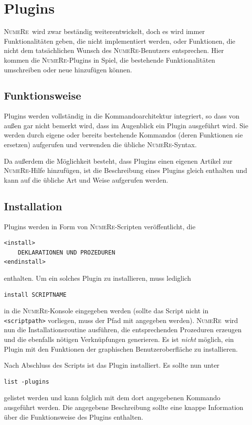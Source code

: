 \documentclass[DIV=14,headsepline,footsepline]{scrbook}
\newcommand{\NR}{\textsc{Nu\-me\-Re}}
\begin{document}
		\chapter{Plugins}
			\NR\ wird zwar beständig weiterentwickelt, doch es wird immer Funktionalitäten geben, die nicht implementiert werden, oder Funktionen, die nicht dem tatsächlichen Wunsch des \NR-Benutzers entsprechen. Hier kommen die \NR-Plugins in Spiel, die bestehende Funktionalitäten umschreiben oder neue hinzufügen können.
			\section{Funktionsweise}
				Plugins werden vollständig in die Kommandoarchitektur integriert, so dass von außen gar nicht bemerkt wird, dass im Augenblick ein Plugin ausgeführt wird. Sie werden durch eigene oder bereits bestehende Kommandos (deren Funktionen sie ersetzen) aufgerufen und verwenden die übliche \NR-Syntax.
				
				Da außerdem die Möglichkeit besteht, dass Plugins einen eigenen Artikel zur \NR-Hilfe hinzufügen, ist die Beschreibung eines Plugins gleich enthalten und kann auf die übliche Art und Weise aufgerufen werden.
			\section{Installation}
				Plugins werden in Form von \NR-Scripten veröffentlicht, die
				\begin{lstlisting}
<install>
	DEKLARATIONEN UND PROZEDUREN
<endinstall>
				\end{lstlisting}
				enthalten. Um ein solches Plugin zu installieren, muss lediglich
				\begin{lstlisting}
install SCRIPTNAME
				\end{lstlisting}
				in die \NR-Konsole eingegeben werden (sollte das Script nicht in \lstinline+<scriptpath>+ vorliegen, muss der Pfad mit angegeben werden). \NR\ wird nun die Installationsroutine ausführen, die entsprechenden Prozeduren erzeugen und die ebenfalls nötigen Verknüpfungen generieren. Es ist \emph{nicht} möglich, ein Plugin mit den Funktionen der graphischen Benutzeroberfläche zu installieren.
				
				Nach Abschluss des Scripts ist das Plugin installiert. Es sollte nun unter
				\begin{lstlisting}
list -plugins
				\end{lstlisting}
				gelistet werden und kann folglich mit dem dort angegebenen Kommando ausgeführt werden. Die angegebene Beschreibung sollte eine knappe Information über die Funktionsweise des Plugins enthalten.
				
\end{document}
